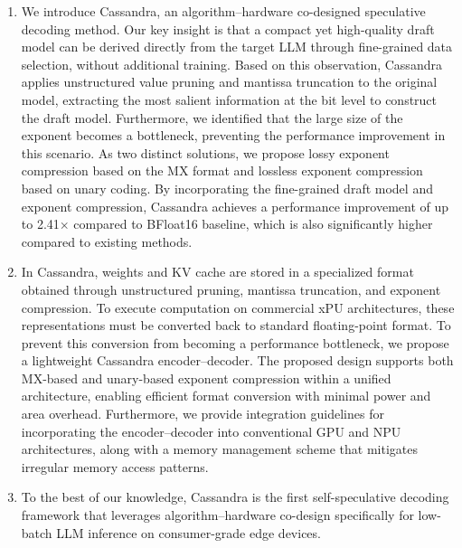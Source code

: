 \begin{enumerate}[label={(\arabic*)}] %
    \item 
        We introduce Cassandra, an algorithm–hardware co-designed speculative decoding method. Our key insight is that a compact yet high-quality draft model can be derived directly from the target LLM through fine-grained data selection, without additional training. Based on this observation, Cassandra applies unstructured value pruning and mantissa truncation to the original model, extracting the most salient information at the bit level to construct the draft model. Furthermore, we identified that the large size of the exponent becomes a bottleneck, preventing the performance improvement in this scenario. As two distinct solutions, we propose lossy exponent compression based on the MX format and lossless exponent compression based on unary coding. By incorporating the fine-grained draft model and exponent compression, Cassandra achieves a performance improvement of up to 2.41$\times$ compared to BFloat16 baseline, which is also significantly higher compared to existing methods.
    \item
        In Cassandra, weights and KV cache are stored in a specialized format obtained through unstructured pruning, mantissa truncation, and exponent compression. To execute computation on commercial xPU architectures, these representations must be converted back to standard floating-point format. To prevent this conversion from becoming a performance bottleneck, we propose a lightweight Cassandra encoder–decoder. The proposed design supports both MX-based and unary-based exponent compression within a unified architecture, enabling efficient format conversion with minimal power and area overhead. Furthermore, we provide integration guidelines for incorporating the encoder–decoder into conventional GPU and NPU architectures, along with a memory management scheme that mitigates irregular memory access patterns.
    
    \item 
        To the best of our knowledge, Cassandra is the first self-speculative decoding framework that leverages algorithm–hardware co-design specifically for low-batch LLM inference on consumer-grade edge devices.
        
\end{enumerate}